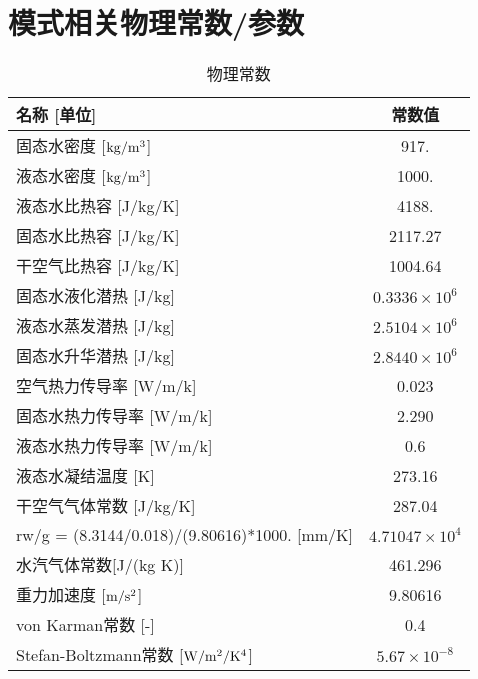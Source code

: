 \chapter{模式相关物理常数/参数}\label{模式相关物理常数参数}
\begin{table}[]
    \centering
    \caption{物理常数}
    \label{tab:物理常数}
    \begin{tabular}{@{}lc@{}}
    \toprule
    名称 {[}单位{]}                                      & 常数值         \\ \midrule
    固态水密度 {[}$\rm kg/m^3${]}                                & 917.        \\
    液态水密度 {[}$\rm kg/m^3${]}                                & 1000.       \\
    液态水比热容 {[}J/kg/K{]}                              & 4188.       \\
    固态水比热容 {[}J/kg/K{]}                              & 2117.27     \\
    干空气比热容 {[}J/kg/K{]}                              & 1004.64     \\
    固态水液化潜热 {[}J/kg{]}                               & $0.3336\times 10^6$  \\
    液态水蒸发潜热 {[}J/kg{]}                               & $2.5104\times 10^6$  \\
    固态水升华潜热 {[}J/kg{]}                               & $2.8440\times 10^6$  \\
    空气热力传导率 {[}W/m/k{]}                              & 0.023       \\
    固态水热力传导率 {[}W/m/k{]}                             & 2.290       \\
    液态水热力传导率 {[}W/m/k{]}                             & 0.6         \\
    液态水凝结温度 {[}K{]}                                  & 273.16      \\
    干空气气体常数 {[}J/kg/K{]}                             & 287.04      \\
    rw/g = (8.3144/0.018)/(9.80616)*1000. {[}mm/K{]} & $4.71047\times 10^4$ \\
    水汽气体常数{[}J/(kg K){]}                             & 461.296     \\
    重力加速度 {[}$\rm m/s^2${]}                                 & 9.80616     \\
    von Karman常数 {[}-{]}                             & 0.4         \\
    Stefan-Boltzmann常数 {[}$\rm W/m^2/K^4${]}                 & $5.67 \times 10^{-8}$   \\\bottomrule
    \end{tabular}
\end{table}

